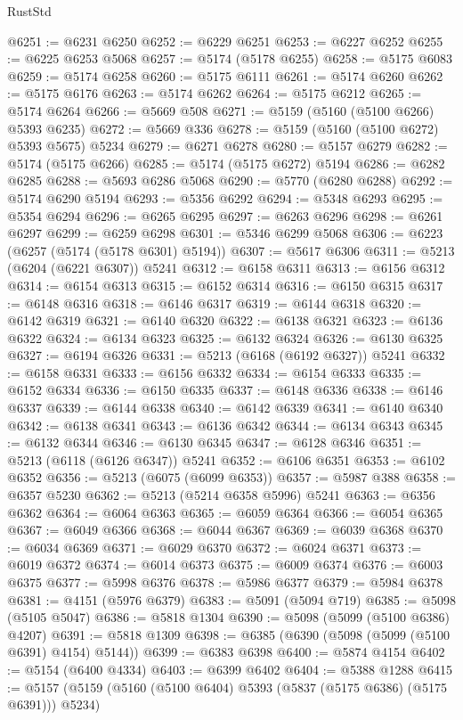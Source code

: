 \begin{lexlean}{RustStd}
\begin{coremodule}
@6251 := @6231 @6250
@6252 := @6229 @6251
@6253 := @6227 @6252
@6255 := @6225 @6253 @5068
@6257 := @5174 (@5178 @6255)
@6258 := @5175 @6083
@6259 := @5174 @6258
@6260 := @5175 @6111
@6261 := @5174 @6260
@6262 := @5175 @6176
@6263 := @5174 @6262
@6264 := @5175 @6212
@6265 := @5174 @6264
@6266 := @5669 @508
@6271 := @5159 (@5160 (@5100 @6266) @5393 @6235)
@6272 := @5669 @336
@6278 := @5159 (@5160 (@5100 @6272) @5393 @5675) @5234
@6279 := @6271 @6278
@6280 := @5157 @6279
@6282 := @5174 (@5175 @6266)
@6285 := @5174 (@5175 @6272) @5194
@6286 := @6282 @6285
@6288 := @5693 @6286 @5068
@6290 := @5770 (@6280 @6288)
@6292 := @5174 @6290 @5194
@6293 := @5356 @6292
@6294 := @5348 @6293
@6295 := @5354 @6294
@6296 := @6265 @6295
@6297 := @6263 @6296
@6298 := @6261 @6297
@6299 := @6259 @6298
@6301 := @5346 @6299 @5068
@6306 := @6223 (@6257 (@5174 (@5178 @6301) @5194))
@6307 := @5617 @6306
@6311 := @5213 (@6204 (@6221 @6307)) @5241
@6312 := @6158 @6311
@6313 := @6156 @6312
@6314 := @6154 @6313
@6315 := @6152 @6314
@6316 := @6150 @6315
@6317 := @6148 @6316
@6318 := @6146 @6317
@6319 := @6144 @6318
@6320 := @6142 @6319
@6321 := @6140 @6320
@6322 := @6138 @6321
@6323 := @6136 @6322
@6324 := @6134 @6323
@6325 := @6132 @6324
@6326 := @6130 @6325
@6327 := @6194 @6326
@6331 := @5213 (@6168 (@6192 @6327)) @5241
@6332 := @6158 @6331
@6333 := @6156 @6332
@6334 := @6154 @6333
@6335 := @6152 @6334
@6336 := @6150 @6335
@6337 := @6148 @6336
@6338 := @6146 @6337
@6339 := @6144 @6338
@6340 := @6142 @6339
@6341 := @6140 @6340
@6342 := @6138 @6341
@6343 := @6136 @6342
@6344 := @6134 @6343
@6345 := @6132 @6344
@6346 := @6130 @6345
@6347 := @6128 @6346
@6351 := @5213 (@6118 (@6126 @6347)) @5241
@6352 := @6106 @6351
@6353 := @6102 @6352
@6356 := @5213 (@6075 (@6099 @6353))
@6357 := @5987 @388
@6358 := @6357 @5230
@6362 := @5213 (@5214 @6358 @5996) @5241
@6363 := @6356 @6362
@6364 := @6064 @6363
@6365 := @6059 @6364
@6366 := @6054 @6365
@6367 := @6049 @6366
@6368 := @6044 @6367
@6369 := @6039 @6368
@6370 := @6034 @6369
@6371 := @6029 @6370
@6372 := @6024 @6371
@6373 := @6019 @6372
@6374 := @6014 @6373
@6375 := @6009 @6374
@6376 := @6003 @6375
@6377 := @5998 @6376
@6378 := @5986 @6377
@6379 := @5984 @6378
@6381 := @4151 (@5976 @6379)
@6383 := @5091 (@5094 @719)
@6385 := @5098 (@5105 @5047)
@6386 := @5818 @1304
@6390 := @5098 (@5099 (@5100 @6386) @4207)
@6391 := @5818 @1309
@6398 := @6385 (@6390 (@5098 (@5099 (@5100 @6391) @4154) @5144))
@6399 := @6383 @6398
@6400 := @5874 @4154
@6402 := @5154 (@6400 @4334)
@6403 := @6399 @6402
@6404 := @5388 @1288
@6415 := @5157 (@5159 (@5160 (@5100 @6404) @5393 (@5837 (@5175 @6386) (@5175 @6391))) @5234)

\end{coremodule}
\end{lexlean}
